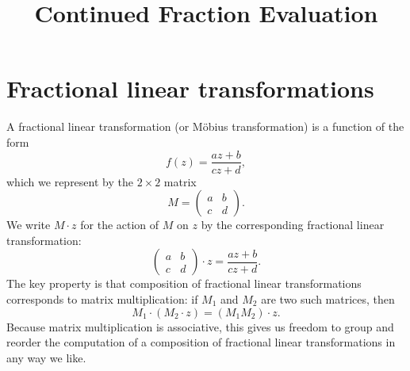 \documentclass{article}
\title{Continued Fraction Evaluation}
\author{}
\date{}
\begin{document}
\maketitle

\section{Fractional linear transformations}

A fractional linear transformation (or M\"obius transformation) is a function of the form
\begin{equation}
  f(z) = \frac{az + b}{cz + d},
\end{equation}
which we represent by the $2 \times 2$ matrix
\begin{equation}
  M = \begin{pmatrix} a & b \\ c & d \end{pmatrix}.
\end{equation}
We write $M \cdot z$ for the action of $M$ on $z$ by the corresponding fractional linear transformation:
\begin{equation}
  \begin{pmatrix} a & b \\ c & d \end{pmatrix} \cdot z = \frac{az + b}{cz + d}.
\end{equation}
The key property is that composition of fractional linear transformations corresponds to matrix multiplication: if $M_1$ and $M_2$ are two such matrices, then
\begin{equation}
  M_1 \cdot (M_2 \cdot z) = (M_1 M_2) \cdot z.
\end{equation}
Because matrix multiplication is associative, this gives us freedom to group and reorder the computation of a composition of fractional linear transformations in any way we like.
\end{document}
